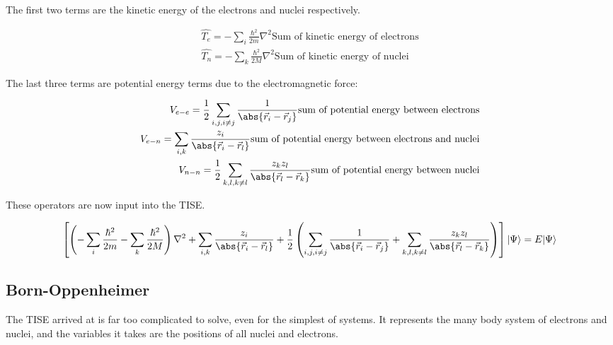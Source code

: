 The first two terms are the kinetic energy of the electrons and nuclei respectively.

\begin{equation}
\begin{split}
\hat{T_e} = - \sum_{i} \frac{\hbar^2}{2 m}  \nabla^2 \text{Sum of kinetic energy of electrons} \\
\hat{T_n} = - \sum_{k} \frac{\hbar^2}{2 M}  \nabla^2 \text{Sum of kinetic energy of nuclei}
\end{split}
\label{eq:eqTimeIndependentSchrodinger}
\end{equation}

The last three terms are potential energy terms due to the electromagnetic force: 

\begin{equation}
\begin{split}
V_{e-e} = \frac{1}{2} \sum_{i,j,i \neq j} \frac{1}{\abs{\vec{r}_i - \vec{r}_j}} \text{sum of potential energy between electrons} \\
V_{e-n} = \sum_{i,k} \frac{z_i}{\abs{\vec{r}_i - \vec{r}_l}} \text{sum of potential energy between electrons and nuclei} \\
V_{n-n} = \frac{1}{2} \sum_{k,l,k \neq l} \frac{z_k z_l}{\abs{\vec{r}_l - \vec{r}_k}} \text{sum of potential energy between nuclei}
\end{split}
\label{eq:eqTimeIndependentSchrodinger}
\end{equation}

These operators are now input into the TISE.


\begin{equation}
\begin{split}
\left[ \left(- \sum_{i} \frac{\hbar^2}{2 m} - \sum_{k} \frac{\hbar^2}{2 M} \right) \nabla^2  + \sum_{i,k} \frac{z_i}{\abs{\vec{r}_i - \vec{r}_l}} + \frac{1}{2} \left( \sum_{i,j,i \neq j} \frac{1}{\abs{\vec{r}_i - \vec{r}_j}} + \sum_{k,l,k \neq l} \frac{z_k z_l}{\abs{\vec{r}_l - \vec{r}_k}} \right) \right] \lvert \Psi \rangle = E \lvert \Psi \rangle
\end{split}
\label{eq:eqTimeIndependentSchrodinger}
\end{equation}



\subsection{Born-Oppenheimer}

The TISE arrived at is far too complicated to solve, even for the simplest of systems.  It represents the many body system of electrons and nuclei, and the variables it takes are the positions of all nuclei and electrons.

